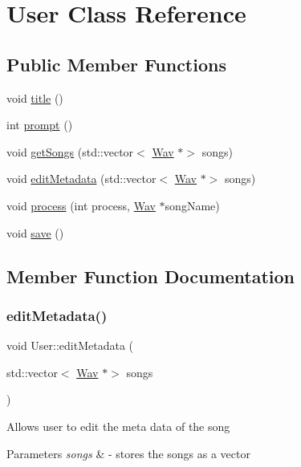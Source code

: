\hypertarget{classUser}{}\section{User Class Reference}
\label{classUser}
\subsection*{Public Member Functions}
\begin{DoxyCompactItemize}
\item 
void \hyperlink{classUser_a3ecab8308e249fe964a75e58eea339dc}{title} ()
\item 
int \hyperlink{classUser_a5e387ee476d9c8388de1c2750e05b64a}{prompt} ()
\item 
void \hyperlink{classUser_a74010d98a04429b4d2d235c6c2092a2f}{get\+Songs} (std\+::vector$<$ \hyperlink{classWav}{Wav} $\ast$$>$ songs)
\item 
void \hyperlink{classUser_a2834ebb7c08f3766a51b14c76d7e1fef}{edit\+Metadata} (std\+::vector$<$ \hyperlink{classWav}{Wav} $\ast$$>$ songs)
\item 
void \hyperlink{classUser_a26fa7b4d62ab16626b37a25b24cf8310}{process} (int process, \hyperlink{classWav}{Wav} $\ast$song\+Name)
\item 
void \hyperlink{classUser_a1e6652772cc099e9cb2c76b54c1ce9da}{save} ()
\end{DoxyCompactItemize}


\subsection{Member Function Documentation}
\mbox{\label{classUser_a2834ebb7c08f3766a51b14c76d7e1fef}} 
\subsubsection{\texorpdfstring{edit\+Metadata()}{editMetadata()}}
{\footnotesize\ttfamily void User\+::edit\+Metadata (\begin{DoxyParamCaption}\item[{std\+::vector$<$ \hyperlink{classWav}{Wav} $\ast$$>$}]{songs }\end{DoxyParamCaption})}

Allows user to edit the meta data of the song 
\begin{DoxyParams}{Parameters}
{\em songs} & -\/ stores the songs as a vector \\
\hline
\end{DoxyParams}
\mbox{\label{classUser_a74010d98a04429b4d2d235c6c2092a2f}} 
